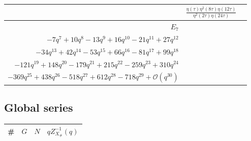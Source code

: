 \documentclass[11pt,a4paper]{amsart}
\theoremstyle{definition}
\begin{document}
\begin{center}
\begin{tabular}{|r| c| c|}
	& $\displaystyle \frac{\eta(\tau)\eta^2(8\tau)\eta(12\tau)}{\eta^2(2\tau)\eta(24\tau)}$ \\

	
		\hline
	$E_7$ & 
	\makecell*{$1 -q + q^2 -2q^3 + 3q^4 -4q^5 + 5q^6 $ \\ $ -7q^7 +
		10q^8 -13q^9 + 16q^{10} -21q^{11} + 27q^{12} $ \\ $ -34q^{13} +
		42q^{14} -53q^{15} + 66q^{16} -81q^{17} + 99q^{18}$ \\ $ -121q^{19} +
		148q^{20} -179q^{21} + 215q^{22} -259q^{23} + 310q^{24} $ \\ $-369q^{25}
		+ 438q^{26} -518q^{27} + 612q^{28} -718q^{29}+ \mathcal{O}(q^{30})$}
	
	& \\
	\hline
	
\end{tabular}
\end{center}


\subsection{Global series}

\begin{center}
\begin{tabular}{|r|c|c|c|}
\hline
\# & $G$ & $N$ & $qZ^{-1}_{X_{\#}}(q)$ \\
\hline
\hline

\end{tabular}
\end{center}


\end{document}
